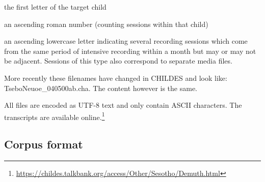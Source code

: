 \documentclass[a4paper, 11pt]{book}
\begin{document}
\begin{itemize*}
	\item the first letter of the target child
	\item an ascending roman number (counting sessions within that child)
	\item an ascending lowercase letter indicating several recording sessions which come from the same period of intensive recording 
		 within a month but may or may not be adjacent. Sessions of this type also correspond to separate media files. 
\end{itemize*}

More recently these filenames have changed in CHILDES and look like: TseboNeuoe\_040500ab.cha. The content however is the same.

All files are encoded as UTF-8 text and only contain ASCII characters. The transcripts are available online.\footnote{\url{https://childes.talkbank.org/access/Other/Sesotho/Demuth.html}}


\subsection{Corpus format}
\end{document}
